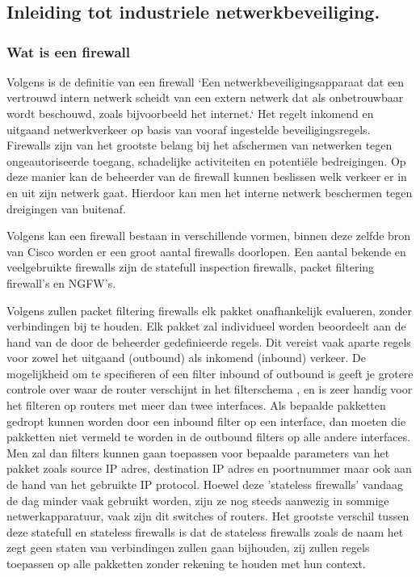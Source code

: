 \chapter{}%
\label{ch:stand-van-zaken}

\section{Inleiding tot industriele netwerkbeveiliging.}

\subsection{Wat is een firewall}
Volgens \textcite{ciscoFW2025} is de definitie van een firewall `Een netwerkbeveiligingsapparaat dat een vertrouwd intern netwerk scheidt van een extern netwerk dat als onbetrouwbaar wordt beschouwd, zoals bijvoorbeeld het internet.` Het regelt inkomend en uitgaand netwerkverkeer op basis van vooraf ingestelde beveiligingsregels. Firewalls zijn van het grootste belang bij het afschermen van netwerken tegen ongeautoriseerde toegang, schadelijke activiteiten en potentiële bedreigingen.
Op deze manier kan de beheerder van de firewall kunnen beslissen welk verkeer er in en uit zijn netwerk gaat. Hierdoor kan men het interne netwerk beschermen tegen dreigingen van buitenaf.


Volgens \textcite{ciscoFW2025} kan een firewall bestaan in verschillende vormen, binnen deze zelfde bron van Cisco worden er een groot aantal firewalls doorlopen. Een aantal bekende en veelgebruikte firewalls zijn de statefull inspection firewalls, packet filtering firewall's  en NGFW's.
 
Volgens \textcite{goel2014} zullen packet filtering firewalls elk pakket onafhankelijk evalueren, zonder verbindingen bij te houden. Elk pakket zal individueel worden beoordeelt aan de hand van de door de beheerder gedefinieerde regels. Dit vereist vaak aparte regels voor zowel het uitgaand (outbound) als inkomend (inbound) verkeer. De mogelijkheid om te specifieren of een filter inbound of outbound is geeft je grotere controle over waar de router verschijnt in het filterschema , en is zeer handig voor het filteren op routers met meer dan twee interfaces. Als bepaalde pakketten gedropt kunnen worden door een inbound filter op een interface, dan moeten die pakketten niet vermeld te worden in de outbound filters op alle andere interfaces. Men zal dan filters kunnen gaan toepassen voor bepaalde parameters van het pakket zoals source IP adres, destination IP adres en poortnummer maar ook aan de hand van het gebruikte IP protocol. Hoewel deze 'stateless firewalls' vandaag de dag minder vaak gebruikt worden, zijn ze nog steeds aanwezig in sommige netwerkapparatuur, vaak zijn dit switches of routers. Het grootste verschil tussen deze statefull en stateless firewalls is dat de stateless firewalls zoals de naam het zegt geen staten van verbindingen zullen gaan bijhouden, zij zullen regels toepassen op alle pakketten zonder rekening te houden met hun context. \autocite{goel2014}

